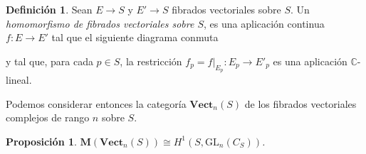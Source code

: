 \documentclass[12pt,a4paper]{article}
\newtheorem{prop}[thm]{Proposición}
\theoremstyle{definition} \newtheorem{defn}[thm]{Definición}
\theoremstyle{definition} \newtheorem{ejemplo}[thm]{Ejemplo}
\theoremstyle{definition} \newtheorem{ejercicio}[thm]{Ejercicio}
\def\CC{\mathbb{C}}
\def\GL{\mathrm{GL}}
\begin{document}
	  \begin{defn}
	    Sean $E\rightarrow S$ y $E'\rightarrow S$ fibrados vectoriales sobre $S$. Un \emph{homomorfismo de fibrados vectoriales sobre $S$}, es una aplicación continua $f:E\rightarrow E'$ tal que el siguiente diagrama conmuta
	    \begin{center}
	    \end{center}
	    y tal que, para cada $p\in S$, la restricción $f_p=f|_{E_p}: E_p \rightarrow E'_p$ es una aplicación $\CC$-lineal.
	  \end{defn}

	  Podemos considerar entonces la categoría $\mathbf{Vect}_n(S)$ de los fibrados vectoriales complejos de rango $n$ sobre $S$. 
	  \begin{prop}
	    $\mathbf{M}(\mathbf{Vect}_n(S)) \cong H^1(S,\GL_n(C_S))$.
	  \end{prop}
\end{document}

